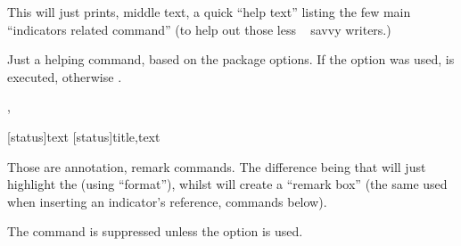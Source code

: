 \documentclass[article,nofontwarning,nogeometry,english,tocdepth=3,secdepth=3]{ufrgscca} %
\begin{document}
\begin{codedescribe}{\helpindicators}
	\begin{codesyntax}%
	\tsmacro{\helpindicators}{}
\end{codesyntax}
This will just prints, middle text, a quick “help text” listing the few main “indicators related command” (to help out those less \LaTeXe~ savvy writers.)
\end{codedescribe}

\begin{codedescribe}{ \ifshowind}
    \begin{codesyntax}%
    \end{codesyntax}
Just a helping command, based on the package options. If the option  was used,  is executed, otherwise .
\end{codedescribe}


\begin{codedescribe}{\textmark, \comment}
	\begin{codesyntax}%
	\tsmacro{\textmark}[status]{text}
	\tsmacro{\comment}[status]{title,text}
\end{codesyntax}
Those are annotation, remark commands. The difference being that \tsmacro{\textmark}{} will just highlight the  (using  “format”), whilst  will create a “remark box” (the same used when inserting an indicator's reference, commands below).
\begin{tsremark}[N.B.:]
 The command \tsmacro{\comment}{} is suppressed unless the option  is used.
 \end{tsremark}
\end{codedescribe}
\end{document}
